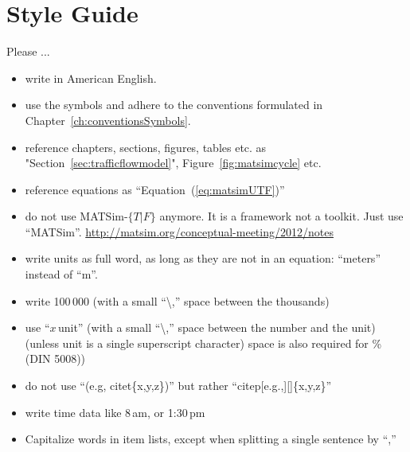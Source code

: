 



\section*{Style Guide}
\label{sec:styleguide}

Please ...

\begin{itemize}

\item write in American English.

\item use the symbols and adhere to the conventions formulated in Chapter~\ref{ch:conventionsSymbols}.

\item reference chapters, sections, figures, tables etc. as "Section~\ref{sec:trafficflowmodel}", Figure~\ref{fig:matsimcycle} etc.

\item reference equations as ``Equation~(\ref{eq:matsimUTF})''

\item do not use MATSim-$\{T\lvert F\}$ anymore. It is a framework not a toolkit. Just use ``MATSim''. \url{http://matsim.org/conceptual-meeting/2012/notes}

\item write units as full word, as long as they are not in an equation: ``meters'' instead of ``m''. 

\item write 100\,000 (with a small ``\textbackslash,'' space between the thousands)

\item use ``$x$\,unit'' (with a small ``\textbackslash,'' space between the number and the unit) (unless unit is a single superscript character) space is also required for \% (DIN 5008))

\item do not use ``(e.g, citet\{x,y,z\})'' but rather ``citep[e.g.,][]\{x,y,z\}''

\item write time data like 8\,am, or 1:30\,pm

\item Capitalize words in item lists, except when splitting a single sentence by ``,''


\end{itemize}
